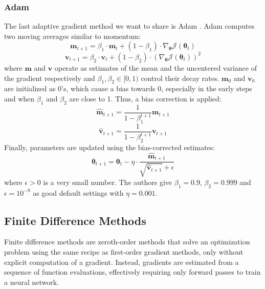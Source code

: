 \subsubsection{Adam}

The last adaptive gradient method we want to share is Adam
\parencite{adam}. Adam computes two moving averages
similar to momentum:  
\begin{equation}
    \mathbf{m}_{t+1} = \beta_1 \cdot \mathbf{m}_t + (1 - \beta_1) \cdot \nabla_{\bm{\theta}} \mathcal{J}(\bm{\theta}_{t})
\end{equation}
\begin{equation}
    \mathbf{v}_{t+1} = \beta_2 \cdot \mathbf{v}_t + (1 - \beta_2) \cdot (\nabla_{\bm{\theta}} \mathcal{J}(\bm{\theta}_{t}))^2
\end{equation}
where $\mathbf{m}$ and $\mathbf{v}$ operate as
estimates of the mean and 
the uncentered variance of the gradient respectively
and $\beta_1, \beta_2 \in [0, 1)$ control their decay rates.
$\mathbf{m}_0$ and $\mathbf{v}_0$ are initialized as 
0's, which cause a bias towards 0, especially in the 
early steps and when $\beta_1$ and $\beta_2$ are close to
1. Thus, a bias correction is applied:
\begin{equation}
    \hat{\mathbf{m}}_{t+1} = \frac{1}{1 - \beta_1^{t+1}}\mathbf{m}_{t+1}
\end{equation}
\begin{equation}
    \hat{\mathbf{v}}_{t+1} = \frac{1}{1 - \beta_2^{t+1}}\mathbf{v}_{t+1}
\end{equation}
Finally, parameters are updated using the bias-corrected 
estimates:
\begin{equation}
    \bm{\theta}_{t+1} = \bm{\theta}_t - \eta \cdot \frac{\hat{\mathbf{m}}_{t+1}}{\sqrt{\hat{\mathbf{v}}_{t+1}} + \epsilon}
\end{equation}
where $\epsilon > 0$ is a very small number. The authors 
give $\beta_1 = 0.9$, $\beta_2 = 0.999$ and 
$\epsilon = 10^{-8}$ as good default settings with
$\eta = 0.001$.

\subsection{Finite Difference Methods}
Finite difference methods are 
zeroth-order methods that solve an optimization problem
using the same recipe as first-order gradient methods, only
without explicit computation of a gradient. Instead, 
gradients are estimated from a sequence of 
function evaluations, effectively requiring only forward
passes to train a neural network.

